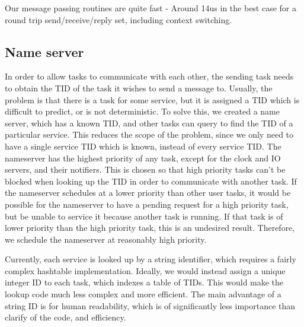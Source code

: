 \documentclass[titlepage]{article}
\begin{document}
Our message passing routines are quite fast - Around 14us in the best case for
a round trip send/receive/reply set, including context switching.

\subsection{Name server}
In order to allow tasks to communicate with each other, the sending task needs to
obtain the TID of the task it wishes to send a message to.
Usually, the problem is that there is a task for some service, but it is assigned
a TID which is difficult to predict, or is not deterministic.
To solve this, we created a name server, which has a known TID, and other tasks
can query to find the TID of a particular service.
This reduces the scope of the problem, since we only need to have a single service
TID which is known, instead of every service TID\@.
The nameserver has the highest priority of any task, except for the clock and IO
servers, and their notifiers.
This is chosen so that high priority tasks can't be blocked when looking up the TID
in order to communicate with another task.
If the nameserver schedules at a lower priority than other user tasks, it would be possible
for the nameserver to have a pending request for a high priority task, but be unable
to service it because another task is running.
If that task is of lower priority than the high priority task, this is an undesired
result.
Therefore, we schedule the nameserver at reasonably high priority.

Currently, each service is looked up by a string identifier, which requires a fairly
complex hashtable implementation.
Ideally, we would instead assign a unique integer ID to each task, which indexes
a table of TIDs.
This would make the lookup code much less complex and more efficient.
The main advantage of a string ID is for human readability, which is of significantly
less importance than clarify of the code, and efficiency.
\end{document}
